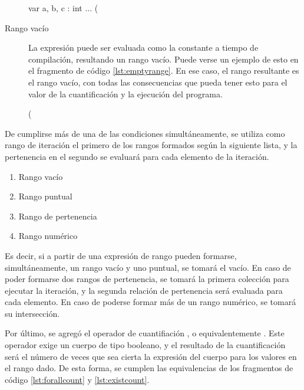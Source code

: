 \begin{description}
\begin{gracielacode}[caption=Cuantificación con rango puntual, label=lst:pointrange]
var a, b, c : int
...
(%
\end{gracielacode}

  \item [Rango vacío] La expresión puede ser evaluada como la constante
   a tiempo de compilación, resultando un rango vacío. Puede verse
  un ejemplo de esto en el fragmento de código \ref{lst:emptyrange}. En ese
  caso, el rango resultante es el rango vacío, con todas las consecuencias que
  pueda tener esto para el valor de la cuantificación y la ejecución del
  programa.

\begin{gracielacode}[caption=Cuantificación con rango puntual, label=lst:emptyrange]
(%
\end{gracielacode}

\end{description}

De cumplirse más de una de las condiciones simultáneamente, se utiliza como
rango de iteración el primero de los rangos formados según la siguiente lista, y
la pertenencia en el segundo se evaluará para cada elemento de la iteración.

\begin{enumerate}
  \item Rango vacío
  \item Rango puntual
  \item Rango de pertenencia
  \item Rango numérico
\end{enumerate}

Es decir, si a partir de una expresión de rango pueden formarse,
simultáneamente, un rango vacío y uno puntual, se tomará el vacío. En caso de
poder formarse dos rangos de pertenencia, se tomará la primera colección para
ejecutar la iteración, y la segunda relación de pertenencia será evaluada para
cada elemento. En caso de poderse formar más de un rango numérico, se tomará su
intersección.

Por último, se agregó el operador de cuantifiación , o
equivalentemente \ingra{#}. Este operador exige un cuerpo de tipo booleano, y el
resultado de la cuantificación será el número de veces que sea cierta la
expresión del cuerpo para los valores en el rango dado. De esta forma, se
cumplen las equivalencias de los fragmentos de código \ref{lst:forallcount} y
\ref{lst:existcount}.

